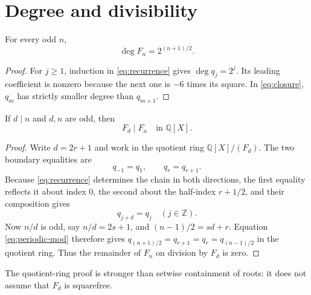 \section{Degree and divisibility}

\begin{theorem}\label{thm:degree}
For every odd $n$,
\begin{equation}\label{eq:degree}
\deg F_n=2^{(n+1)/2}.
\end{equation}
\end{theorem}

\begin{proof}
For $j\ge1$, induction in \eqref{eq:recurrence} gives
$\deg q_j=2^j$.  Its leading coefficient is nonzero because the next one is
$-6$ times its square.  In \eqref{eq:closure}, $q_m$ has strictly smaller
degree than $q_{m+1}$.
\end{proof}

\begin{theorem}\label{thm:divisibility}
If $d\mid n$ and $d,n$ are odd, then
\begin{equation}\label{eq:divisibility}
F_d\mid F_n\quad\text{in }\mathbb Q[X].
\end{equation}
\end{theorem}

\begin{proof}
Write $d=2r+1$ and work in the quotient ring
$\mathbb Q[X]/(F_d)$.  The two boundary equalities are
\[
q_{-1}=q_1,\qquad q_r=q_{r+1}.
\]
Because \eqref{eq:recurrence} determines the chain in both directions, the
first equality reflects it about index $0$, the second about the half-index
$r+1/2$, and their composition gives
\begin{equation}\label{eq:periodic-mod}
q_{j+d}=q_j\quad(j\in\mathbb Z).
\end{equation}
Now $n/d$ is odd, say $n/d=2s+1$, and
$(n-1)/2=sd+r$.  Equation \eqref{eq:periodic-mod} therefore gives
$q_{(n+1)/2}=q_{r+1}=q_r=q_{(n-1)/2}$ in the quotient ring.  Thus the
remainder of $F_n$ on division by $F_d$ is zero.
\end{proof}

The quotient-ring proof is stronger than setwise containment of roots: it
does not assume that $F_d$ is squarefree.
